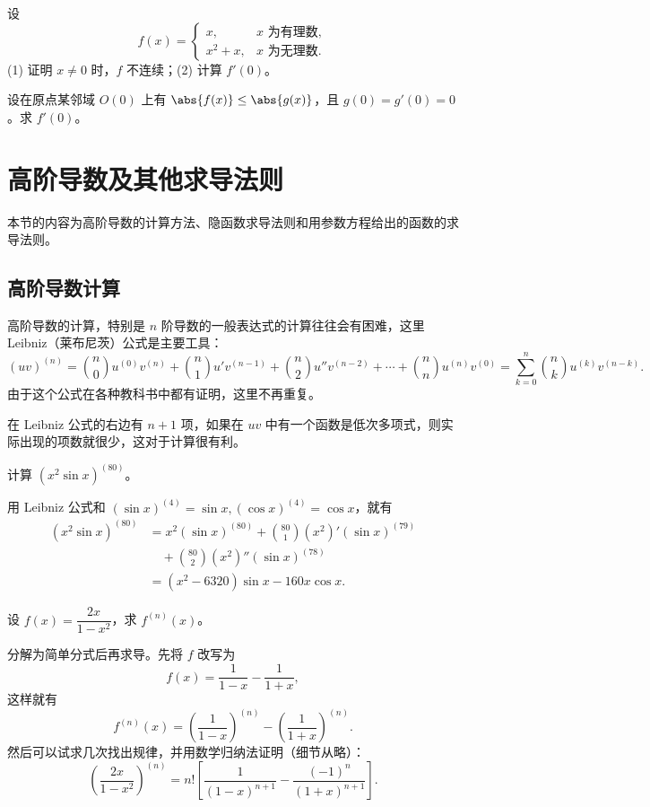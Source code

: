 \begin{xexercise}[11]
设
  \[
    f(x)=\begin{cases}x,&x\text{ 为有理数},\\x^2+x,&x\text{ 为无理数}.
    \end{cases}
  \]
  (1) 证明 $x\ne0$ 时，$f$ 不连续；(2) 计算 $f'(0)$。
\end{xexercise}

\begin{xexercise}[12]
设在原点某邻域 $O(0)$ 上有 $\abs{f(x)}\le\abs{g(x)}$，且 $g(0)=g'(0)=0$。求 $f'(0)$。
\end{xexercise}


\section{高阶导数及其他求导法则}

本节的内容为高阶导数的计算方法、隐函数求导法则和用参数方程给出的函数的求导法则。

\subsection{高阶导数计算}

高阶导数的计算，特别是 $n$ 阶导数的一般表达式的计算往往会有困难，这里 Leibniz（莱布尼茨）公式是主要工具：
\[
  (uv)^{(n)}
  =\binom n0u^{(0)}v^{(n)}+\binom n1u'v^{(n-1)}+\binom n2u''v^{(n-2)}+\cdots+\binom nn u^{(n)}v^{(0)}
  =\sum_{k=0}^n\binom nk u^{(k)}v^{(n-k)}.
\]
由于这个公式在各种教科书中都有证明，这里不再重复。

在 Leibniz 公式的右边有 $n+1$ 项，如果在 $uv$ 中有一个函数是低次多项式，则实际出现的项数就很少，这对于计算很有利。

\begin{xexample}[6.2.1]
计算 $(x^2\sin x)^{(80)}$。
\end{xexample}
\begin{xsolution}
用 Leibniz 公式和 $(\sin x)^{(4)}=\sin x,(\cos x)^{(4)}=\cos x$，就有
\[
\begin{aligned}
  (x^2\sin x)^{(80)}
  &=x^2(\sin x)^{(80)}+\binom{80}{1}(x^2)'(\sin x)^{(79)}\\
  &\quad+\binom{80}{2}(x^2)''(\sin x)^{(78)}\\
  &=(x^2-6320)\sin x-160x\cos x.
\end{aligned}
\]
\end{xsolution}

\begin{xexample}[6.2.2]
设 $f(x)=\dfrac{2x}{1-x^2}$，求 $f^{(n)}(x)$。
\end{xexample}
\begin{xsolution}
分解为简单分式后再求导。先将 $f$ 改写为
\[
  f(x)=\frac1{1-x}-\frac1{1+x},
\]
这样就有
\[
  f^{(n)}(x)=\left(\frac1{1-x}\right)^{(n)}-\left(\frac1{1+x}\right)^{(n)}.
\]
然后可以试求几次找出规律，并用数学归纳法证明（细节从略）：
\[
  \left(\frac{2x}{1-x^2}\right)^{(n)}
  =n!\left[\frac1{(1-x)^{n+1}}-\frac{(-1)^n}{(1+x)^{n+1}}\right].
\]
\end{xsolution}

